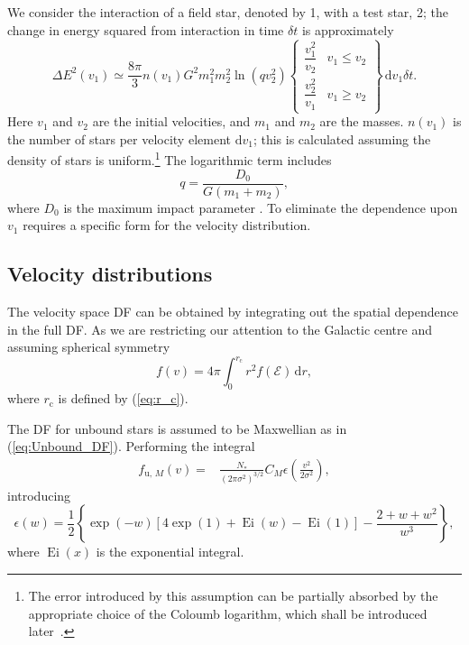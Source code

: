 \documentclass[useAMS,usedcolumn,usegraphicx,usenatbib]{mn2e}
\newcommand{\eqnref}[1]{(\ref{eq:#1})}
\DeclareMathOperator{\Ei}{Ei}
\newcommand{\sub}[1]{\ensuremath{_\mathrm{#1}}}
\newcommand{\dd}{\ensuremath{\mathrm{d}}}
\newcommand{\intd}[4]{\ensuremath{\displaystyle \int_{#1}^{#2}{#3}\,\dd{#4}}}
\newcommand{\recip}[1]{\ensuremath{\dfrac{1}{#1}}}
\begin{document}
\begin{onecolumn}
We consider the interaction of a field star, denoted by 1, with a test star, 2; the change in energy squared from interaction in time $\delta t$ is approximately \citep[chapter 2]{Chandrasekhar1960}
\begin{equation}
\Delta E^2(v_1) \simeq \frac{8\pi}{3} n(v_1)G^2m_1^2 m_2^2\ln\left(qv_2^2\right)\left\{\begin{array}{lr}\dfrac{v_1^2}{v_2} & v_1 \leq v_2\\ \dfrac{v_2^2}{v_1} & v_1 \geq v_2 \end{array}\right\}\,\dd v_1\delta t.
\end{equation}
Here $v_1$ and $v_2$ are the initial velocities, and $m_1$ and $m_2$ are the masses. $n(v_1)$ is the number of stars per velocity element $\dd v_1$; this is calculated assuming the density of stars is uniform.\footnote{The error introduced by this assumption can be partially absorbed by the appropriate choice of the Coloumb logarithm, which shall be introduced later~\citep{Just2011}.} The logarithmic term includes
\begin{equation}
q = \frac{D_0}{G\left(m_1+m_2\right)},
\end{equation}
where $D_0$ is the maximum impact parameter \citep{Weinberg1986}. To eliminate the dependence upon $v_1$ requires a specific form for the velocity distribution.

\subsection{Velocity distributions}

The velocity space DF can be obtained by integrating out the spatial dependence in the full DF. As we are restricting our attention to the Galactic centre and assuming spherical symmetry
\begin{equation}
f(v) = 4\pi\intd{0}{r\sub{c}}{r^2f(\mathcal{E})}{r},
\end{equation}
where $r\sub{c}$ is defined by \eqnref{r_c}.

The DF for unbound stars is assumed to be Maxwellian as in \eqnref{Unbound_DF}. Performing the integral
\begin{align}
f_{\mathrm{u},\,M}(v) = {} & \frac{N_\ast}{\left(2\pi\sigma^2\right)^{3/2}}C_M\epsilon\left(\frac{v^2}{2\sigma^2}\right),
\end{align}
introducing
\begin{equation}
\epsilon(w) = \recip{2}\left\{\exp(-w)\left[4\exp(1) + \Ei(w) - \Ei(1)\right] - \frac{2 + w + w^2}{w^3}\right\},
\end{equation}
where $\Ei(x)$ is the exponential integral.


\end{onecolumn}
\end{document}
